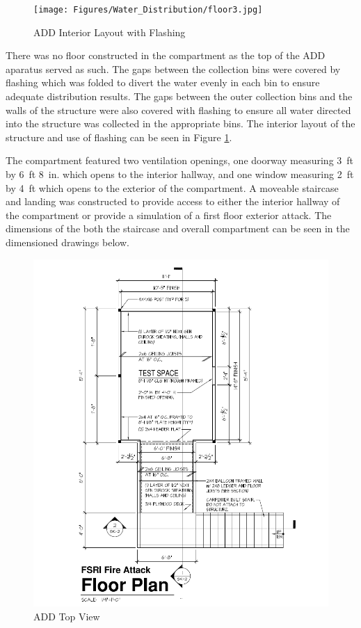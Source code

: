 \documentclass{article}
\begin{document}
\clearpage

\begin{figure}[!ht]
	\centering
	\texttt{[image: Figures/Water\_Distribution/floor3.jpg]}
	\caption{ADD Interior Layout with Flashing}
	\label{fig:ADD_Flashing}
\end{figure}

There was no floor constructed in the compartment as the top of the ADD aparatus served as such. The gaps between the collection bins were covered by flashing which was folded to divert the water evenly in each bin to ensure adequate distribution results. The gaps between the outer collection bins and the walls of the structure were also covered with flashing to ensure all water directed into the structure was collected in the appropriate bins. The interior layout of the structure and use of flashing can be seen in Figure \ref{fig:ADD_Flashing}. 

The compartment featured two ventilation openings, one doorway measuring 3~ft by 6~ft 8~in. which opens to the interior hallway, and one window measuring 2~ft by 4~ft which opens to the exterior of the compartment. A moveable staircase and landing was constructed to provide access to either the interior hallway of the compartment or provide a simulation of a first floor exterior attack. The dimensions of the both the staircase and overall compartment can be seen in the dimensioned drawings below.

\begin{figure}[!ht]
	\centering
	\includegraphics[width=5.5in]{Figures/Water_Distribution/ADDtopviewprint.png}
	\caption{ADD Top View}
	\label{fig:ADD_Top_View}
\end{figure}
\end{document}
